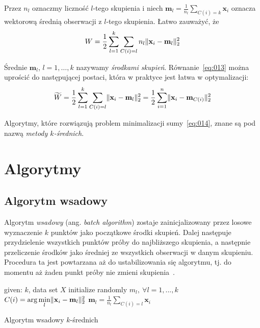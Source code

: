 \documentclass{praca1}
\DeclarePairedDelimiter{\norm}{\lVert}{\rVert}
\begin{document}
Przez $n_l$ oznaczmy liczność $l$-tego skupienia i niech $\mathbf{m}_l = \frac{1}{n_l} \sum\limits_{C(i) = k} \mathbf{x}_i$ oznacza wektorową średnią obserwacji z $l$-tego skupienia. Łatwo zauważyć, że~\cite{Koronacki2005:statystyczne}
\begin{equation}
\label{eq:013}
W = \frac{1}{2}\sum\limits_{l=1}^{k}\sum\limits_{C(i) = l} n_l \norm{\mathbf{x}_i - \mathbf{m}_l}_2^2
\end{equation}

Średnie $\mathbf{m}_l$, $l = 1,\ldots, k$ nazywamy \emph{środkami skupień}. Równanie~\ref{eq:013} można uprościć do następującej postaci, która w praktyce jest łatwa w optymalizacji:
\begin{equation}
\label{eq:014}
\widetilde{W} = \frac{1}{2}\sum\limits_{l=1}^{k}\sum\limits_{C(i) = l} \norm{\mathbf{x}_i - \mathbf{m}_l}_2^2 = \frac{1}{2}\sum\limits_{i=1}^{n} \norm{\mathbf{x}_i - \mathbf{m}_{C(i)}}_2^2 
\end{equation}

Algorytmy, które rozwiązują problem minimalizacji sumy~\ref{eq:014}, znane są pod nazwą \emph{metody $k$-średnich}.

\section{Algorytmy}

\subsection{Algorytm wsadowy}


Algorytm \emph{wsadowy} (ang. \emph{batch algorithm}) zostaje zainicjalizowany przez losowe wyznaczenie $k$ punktów jako początkowe środki skupień. Dalej następuje przydzielenie wszystkich punktów próby do najbliższego skupienia, a następnie przeliczenie środków jako średniej ze wszystkich obserwacji w danym skupieniu. Procedura ta jest powtarzana aż do ustabilizowania się algorytmu, tj. do momentu aż żaden punkt próby nie zmieni skupienia~\cite{Wu2007:topten}.

\begin{algorithm}[!h]
\begin{algorithmic}[1]
		\State given: $k$, data set $X$
        \State initialize randomly $m_l, \ \forall l=1, ..., k$
        \Repeat
                \State $C(i) = \arg \min\limits_{l} \norm{\mathbf{x}_i - \mathbf{m}_l }_2^2 $
            \EndFor
                \State $\mathbf{m}_l = \frac{1}{n_l}\sum\limits_{C(i) = l} \mathbf{x}_i$
            \EndFor

\end{algorithmic}
\caption{Algorytm wsadowy $k$-średnich}\label{alg:001}
\end{algorithm}
\end{document}
